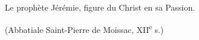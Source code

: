 Le prophète Jérémie, figure du Christ en sa Passion.\par
(Abbatiale Saint-Pierre de Moissac, XII\textsuperscript{e} s.)

